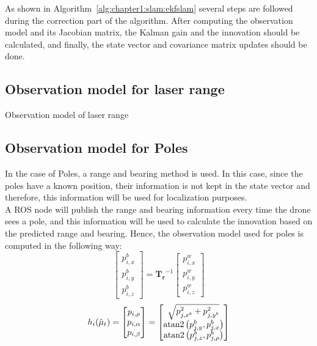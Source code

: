 As shown in Algorithm~\ref{alg:chapter1:slam:ekfslam} several steps are followed during the correction part of the algorithm. After computing the observation model and its Jacobian matrix, the Kalman gain and the innovation should be calculated, and finally, the state vector and covariance matrix updates should be done.

\subsection{Observation model for laser range}
\label{subsec:chapter2:correction:range}
Observation model of laser range

\subsection{Observation model for Poles}
\label{subsec:chapter2:correction:poles}
In the case of Poles, a range and bearing method is used. In this case, since the poles have a known position, their information is not kept in the state vector and therefore, this information will be used for localization purposes.\\

A ROS node will publish the range and bearing information every time the drone sees a pole, and this information will be used to calculate the innovation based on the predicted range and bearing. Hence, the observation model used for poles is computed in the following way:
\begin{equation}
    \begin{bmatrix}
        p_{i, x}^b \\ p_{i, y}^b \\ p_{i, z}^b
    \end{bmatrix} = \bm{T_r}^{-1} \begin{bmatrix}
        p_{i, x}^w \\ p_{i, y}^w \\ p_{i, z}^w
\end{bmatrix}
\label{eq:chapter2:correction:pole:world2body_transform}
\end{equation}
\begin{equation}
    h_i(\hat\mu_t) = \begin{bmatrix}
        p_{i, \rho} \\ p_{i, \alpha} \\ p_{i, \beta}
    \end{bmatrix} = \begin{bmatrix}
    \sqrt{ p_{j, x^b}^2 + p_{j, y^b}^2 } \\
    \operatorname{atan2}\left(p_{j, y}^b, p_{j, x}^b\right) \\
    \operatorname{atan2}\left(p_{j, z}^b, p_{j,\rho}^b\right)
\end{bmatrix}
\label{eq:chapter2:correction:pole:range_bearing}
\end{equation}

